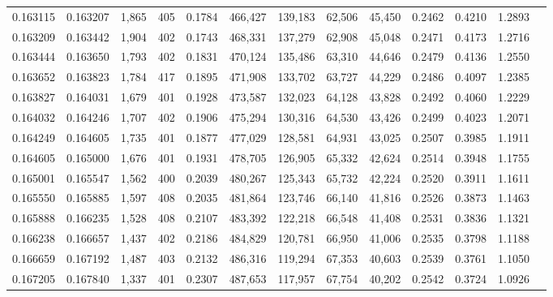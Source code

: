 \begin{tabular}{rrrrrrrrrrrrr}
0.163115 & 0.163207 & 1,865 & 405 &                                     0.1784 & 466,427 & 139,183 &  62,506 &  45,450 & 0.2462 & 0.4210 & 1.2893 \\
0.163209 & 0.163442 & 1,904 & 402 &                                     0.1743 & 468,331 & 137,279 &  62,908 &  45,048 & 0.2471 & 0.4173 & 1.2716 \\
0.163444 & 0.163650 & 1,793 & 402 &                                     0.1831 & 470,124 & 135,486 &  63,310 &  44,646 & 0.2479 & 0.4136 & 1.2550 \\
0.163652 & 0.163823 & 1,784 & 417 &                                     0.1895 & 471,908 & 133,702 &  63,727 &  44,229 & 0.2486 & 0.4097 & 1.2385 \\
0.163827 & 0.164031 & 1,679 & 401 &                                     0.1928 & 473,587 & 132,023 &  64,128 &  43,828 & 0.2492 & 0.4060 & 1.2229 \\
0.164032 & 0.164246 & 1,707 & 402 &                                     0.1906 & 475,294 & 130,316 &  64,530 &  43,426 & 0.2499 & 0.4023 & 1.2071 \\
0.164249 & 0.164605 & 1,735 & 401 &                                     0.1877 & 477,029 & 128,581 &  64,931 &  43,025 & 0.2507 & 0.3985 & 1.1911 \\
0.164605 & 0.165000 & 1,676 & 401 &                                     0.1931 & 478,705 & 126,905 &  65,332 &  42,624 & 0.2514 & 0.3948 & 1.1755 \\
0.165001 & 0.165547 & 1,562 & 400 &                                     0.2039 & 480,267 & 125,343 &  65,732 &  42,224 & 0.2520 & 0.3911 & 1.1611 \\
0.165550 & 0.165885 & 1,597 & 408 &                                     0.2035 & 481,864 & 123,746 &  66,140 &  41,816 & 0.2526 & 0.3873 & 1.1463 \\
0.165888 & 0.166235 & 1,528 & 408 &                                     0.2107 & 483,392 & 122,218 &  66,548 &  41,408 & 0.2531 & 0.3836 & 1.1321 \\
0.166238 & 0.166657 & 1,437 & 402 &                                     0.2186 & 484,829 & 120,781 &  66,950 &  41,006 & 0.2535 & 0.3798 & 1.1188 \\
0.166659 & 0.167192 & 1,487 & 403 &                                     0.2132 & 486,316 & 119,294 &  67,353 &  40,603 & 0.2539 & 0.3761 & 1.1050 \\
0.167205 & 0.167840 & 1,337 & 401 &                                     0.2307 & 487,653 & 117,957 &  67,754 &  40,202 & 0.2542 & 0.3724 & 1.0926 \\

\end{tabular}
